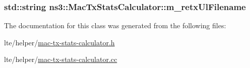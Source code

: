 \subsubsection[{\texorpdfstring{m\+\_\+retx\+Ul\+Filename}{m_retxUlFilename}}]{\setlength{\rightskip}{0pt plus 5cm}std\+::string ns3\+::\+Mac\+Tx\+Stats\+Calculator\+::m\+\_\+retx\+Ul\+Filename}\hypertarget{classns3_1_1MacTxStatsCalculator_a7b38624618fb78d0935a215c77d9efb3}{}\label{classns3_1_1MacTxStatsCalculator_a7b38624618fb78d0935a215c77d9efb3}


The documentation for this class was generated from the following files\+:\begin{DoxyCompactItemize}
\item 
lte/helper/\hyperlink{mac-tx-stats-calculator_8h}{mac-\/tx-\/stats-\/calculator.\+h}\item 
lte/helper/\hyperlink{mac-tx-stats-calculator_8cc}{mac-\/tx-\/stats-\/calculator.\+cc}\end{DoxyCompactItemize}
